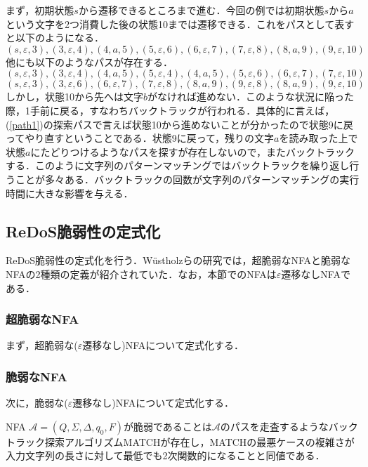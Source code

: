 \documentclass[a4paper, 12pt, dvipdfmx, uplatex]{jsreport}
\begin{document}
まず，初期状態$s$から遷移できるところまで進む．今回の例では初期状態$s$から$a$という文字を2つ消費した後の状態10までは遷移できる．これをパスとして表すと以下のようになる．
\begin{equation}
  (s,\varepsilon,3),(3,\varepsilon,4),(4,a,5),(5,\varepsilon,6),(6,\varepsilon,7),(7,\varepsilon,8),(8,a,9),(9,\varepsilon,10)\label{path1}
\end{equation}
他にも以下のようなパスが存在する．
\begin{equation*}
  (s,\varepsilon,3),(3,\varepsilon,4),(4,a,5),(5,\varepsilon,4),(4,a,5),(5,\varepsilon,6),(6,\varepsilon,7),(7,\varepsilon,10)
\end{equation*}
\begin{equation*}
  (s,\varepsilon,3),(3,\varepsilon,6),(6,\varepsilon,7),(7,\varepsilon,8),(8,a,9),(9,\varepsilon,8),(8,a,9),(9,\varepsilon,10)
\end{equation*}
しかし，状態10から先へは文字$b$がなければ進めない．このような状況に陥った際，1手前に戻る，すなわちバックトラックが行われる．具体的に言えば，(\ref{path1})の探索パスで言えば状態10から進めないことが分かったので状態9に戻ってやり直すということである．状態9に戻って，残りの文字$a$を読み取った上で状態$a$にたどりつけるようなパスを探すが存在しないので，またバックトラックする．このように文字列のパターンマッチングではバックトラックを繰り返し行うことが多々ある．バックトラックの回数が文字列のパターンマッチングの実行時間に大きな影響を与える．


\subsection{ReDoS脆弱性の定式化}
ReDoS脆弱性の定式化を行う．W\"{u}stholzらの研究\cite{vul_detect}では，超脆弱なNFAと脆弱なNFAの2種類の定義が紹介されていた．なお，本節でのNFAは$\varepsilon$遷移なしNFAである．

\subsubsection{超脆弱なNFA}
まず，超脆弱な($\varepsilon$遷移なし)NFAについて定式化する．

\subsubsection{脆弱なNFA}
次に，脆弱な($\varepsilon$遷移なし)NFAについて定式化する．
\begin{dfn}[脆弱なNFA]
  NFA $\mathcal{A}=(Q,\Sigma,\Delta,q_0,F)$が脆弱であることは$\mathcal{A}$のパスを走査するようなバックトラック探索アルゴリズムMATCHが存在し，MATCHの最悪ケースの複雑さが入力文字列の長さに対して最低でも2次関数的になることと同値である．
\end{dfn}
\end{document}
